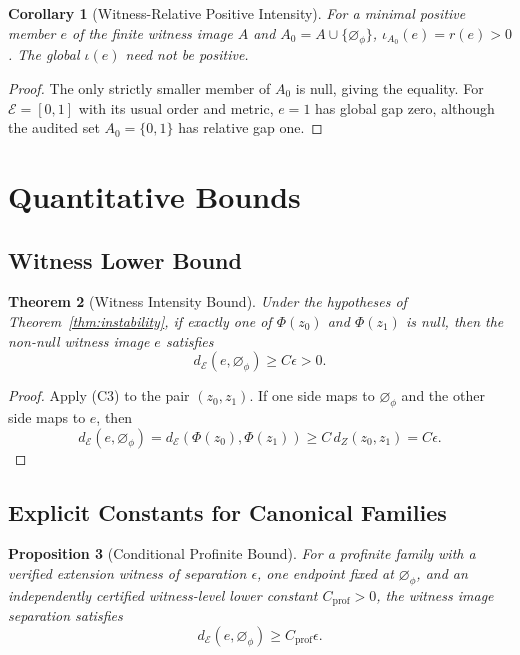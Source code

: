 \documentclass[11pt,a4paper]{article}
\theoremstyle{plain}
\newtheorem{theorem}{Theorem}[section]
\newtheorem{proposition}[theorem]{Proposition}
\newtheorem{corollary}[theorem]{Corollary}
\theoremstyle{definition}
\theoremstyle{remark}
\newcommand{\E}{\mathcal{E}}
\newcommand{\dE}{d_{\mathcal{E}}}
\newcommand{\nullphi}{\varnothing_\phi}
\begin{document}
\begin{corollary}[Witness-Relative Positive Intensity]\label{cor:intensity}
For a minimal positive member $e$ of the finite witness image $A$ and $A_0=A\cup\{\nullphi\}$, $\iota_{A_0}(e)=r(e)>0$. The global $\iota(e)$ need not be positive.
\end{corollary}

\begin{proof}
The only strictly smaller member of $A_0$ is null, giving the equality. For $\E=[0,1]$ with its usual order and metric, $e=1$ has global gap zero, although the audited set $A_0=\{0,1\}$ has relative gap one.
\end{proof}

\section{Quantitative Bounds}

\subsection{Witness Lower Bound}

\begin{theorem}[Witness Intensity Bound]\label{thm:bound}
Under the hypotheses of Theorem~\ref{thm:instability}, if exactly one of $\Phi(z_0)$ and $\Phi(z_1)$ is null, then the non-null witness image $e$ satisfies
\[
\dE(e,\nullphi)\geq C\epsilon>0.
\]
\end{theorem}

\begin{proof}
Apply (C3) to the pair $(z_0,z_1)$. If one side maps to $\nullphi$ and the other side maps to $e$, then
\[
\dE(e,\nullphi)=\dE(\Phi(z_0),\Phi(z_1))\geq C\,d_Z(z_0,z_1)=C\epsilon.
\]
\end{proof}

\subsection{Explicit Constants for Canonical Families}

\begin{proposition}[Conditional Profinite Bound]
For a profinite family with a verified extension witness of separation $\epsilon$, one endpoint fixed at $\nullphi$, and an independently certified witness-level lower constant $C_{\mathrm{prof}}>0$, the witness image separation satisfies
\[
\dE(e,\nullphi)\geq C_{\mathrm{prof}}\epsilon.
\]
\end{proposition}
\end{document}

